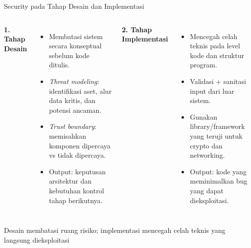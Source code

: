 \documentclass[aspectratio=169, table]{beamer}
\begin{document}
\begin{frame}{Security pada Tahap Desain dan Implementasi}
	\vspace{10pt}
	\begin{columns}[t]
		\textbf{1. Tahap Desain}
		\begin{itemize}
			\item Membatasi sistem secara konseptual sebelum kode ditulis.
			\item \emph{Threat modeling}: identifikasi aset, alur data kritis, dan potensi ancaman.
			\item \emph{Trust boundary}: memisahkan komponen dipercaya vs tidak dipercaya.
			\item Output: keputusan arsitektur dan kebutuhan kontrol tahap berikutnya.
		\end{itemize}
		
		\textbf{2. Tahap Implementasi}
		\begin{itemize}
			\item Mencegah celah teknis pada level kode dan struktur program.
			\item Validasi + sanitasi input dari luar sistem.
			\item Gunakan library/framework yang teruji untuk crypto dan networking.
			\item Output: kode yang meminimalkan bug yang dapat dieksploitasi.
		\end{itemize}
	\end{columns}
	
	\vspace{6pt}
	{\footnotesize Desain membatasi ruang risiko; implementasi mencegah celah teknis yang langsung dieksploitasi}
\end{frame}
\end{document}
